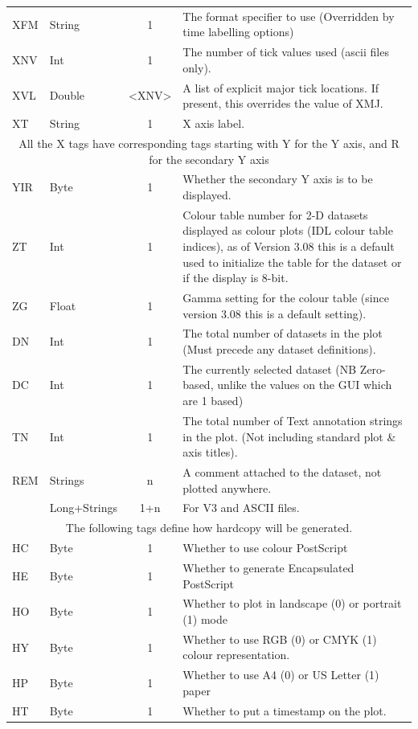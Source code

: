 \documentclass[english]{article}
\begin{document}
\begin{longtable}{|llcp{9cm}|}
  XFM & String & 1 & The format specifier to use (Overridden by time
  labelling options) \\
  XNV & Int & 1 & The number of tick values used (ascii files only).\\
  XVL & Double & <XNV> & A list of explicit major tick locations. If
  present, this overrides the value of XMJ.\\
  XT& String& 1&
  X axis label.\\
  \hline \multicolumn{4}{|c|}{All the X tags have corresponding tags
    starting
    with Y for the Y axis, and R for the secondary Y axis}\\
  \hline
  YIR & Byte & 1 & Whether the secondary Y axis is to be displayed.\\
  \hline ZT& Int& 1& Colour table number for 2-D datasets displayed as
  colour plots (IDL colour table indices), as of Version 3.08 this is a
  default used to initialize the table for the dataset or if the
  display is 8-bit.\\
  ZG& Float& 1& Gamma setting for the colour table (since version 3.08
  this is a
  default setting).\\
  DN& Int& 1& The total number of datasets in the plot (Must precede
  any dataset
  definitions).\\
  DC& Int& 1& The currently selected dataset (NB Zero-based, unlike the
  values on
  the GUI which are 1 based)\\
  TN& Int& 1& The total number of Text annotation strings in the
  plot. (Not including
  standard plot \& axis titles).\\
  REM& Strings& n&
  A comment attached to the dataset, not plotted anywhere.\\
  & Long+Strings& 1+n&
  For V3 and ASCII files.\\
  \hline
  \multicolumn{4}{|c|}{The following tags define how hardcopy will be generated.}\\
  \hline HC& Byte& 1&
  Whether to use colour PostScript\\
  HE& Byte& 1&
  Whether to generate Encapsulated PostScript\\
  HO& Byte& 1&
  Whether to plot in landscape (0) or portrait (1) mode\\
  HY& Byte & 1 & Whether to use RGB (0) or CMYK (1) colour representation.\\
  HP& Byte& 1&
  Whether to use A4 (0) or US Letter (1) paper\\
  HT& Byte& 1&
  Whether to put a timestamp on the plot.\\

\end{longtable}
\end{document}
